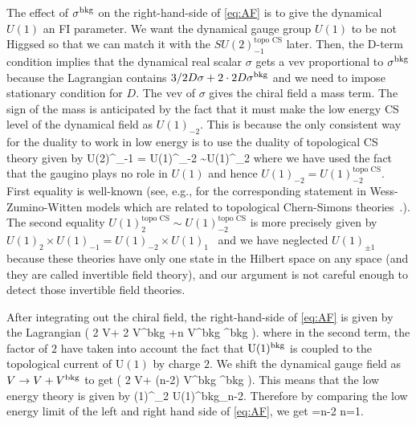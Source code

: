 \documentclass[a4paper,11pt]{article}
\def\U{\mathrm{U}}
\def\beq#1\eeq{\begin{align}#1\end{align}}
\begin{document}
The effect of $\sigma^{\rm bkg}$ on the right-hand-side of \eqref{eq:AF} is to give the dynamical $U(1)$ an FI parameter. 
We want the dynamical gauge group $U(1)$ to be not Higgsed so that we can match it with the $SU(2)^\text{topo CS}_{-1}$ later. 
Then, the D-term condition implies that the dynamical real scalar $\sigma$ gets a vev proportional to $\sigma^{\rm bkg}$
because the Lagrangian contains $3/2D \sigma + 2 \cdot 2D  \sigma^{\rm bkg}$ and we need to impose stationary condition for $D$.
The vev of $\sigma$ gives the chiral field a mass term. The sign of the mass is anticipated by the fact that it must make the low energy CS level of the dynamical field
as $U(1)_{-2}$. This is because the only consistent way for the duality to work in low energy is to use the duality of topological CS theory given by 
\beq
SU(2)^_{-1} = U(1)^_{-2} \sim  U(1)^_{2}
\eeq
where we have used the fact that the gaugino plays no role in $U(1)$ and hence $U(1)_{-2}=U(1)^\text{topo CS}_{-2}$.
First equality is well-known (see, e.g., \cite{DiFrancesco:1997nk} for the corresponding statement in Wess-Zumino-Witten models which are related to
topological Chern-Simons theories~\cite{Witten:1988hf}.).
The second equality $ U(1)^\text{topo CS}_{2} \sim  U(1)^\text{topo CS}_{-2}$ is more precisely given by 
$U(1)_2 \times U(1)_{-1} =U(1)_{-2} \times U(1)_{1}$~\cite{Seiberg:2016rsg, Tachikawa:2016cha, Tachikawa:2016nmo}
and we have neglected $U(1)_{\pm 1}$ because these theories have only one state in the Hilbert space on any space (and they are called invertible field theory),
and our argument is not careful enough to detect those invertible field theories.

After integrating out the chiral field, 
the right-hand-side of \eqref{eq:AF} is given by the Lagrangian
\beq
\frac{1}{4\pi } \left(  2 V\Sigma + 2    V\Sigma^{\rm bkg} +n V^{\rm bkg} \Sigma^{\rm bkg}   \right).
\eeq
where in the second term, the factor of $2$ have taken into account the fact that $\U(1)^{\rm bkg}$ is coupled to the topological current of $\U(1)$ by charge $2$.
We shift the dynamical gauge field as $V \to V+V^{\rm bkg}$ to get
\beq
\frac{1}{4\pi } \left(  2 V\Sigma + (n-2) V^{\rm bkg} \Sigma^{\rm bkg}   \right).
\eeq
This means that the low energy theory is given by
\beq
U(1)^_{2} \oplus U(1)^{\rm bkg}_{n-2}.
\eeq
Therefore by comparing the low energy limit of the left and right hand side of \eqref{eq:AF}, we get
\beq
-1=n-2  \Longrightarrow n=1.
\eeq
\end{document}
